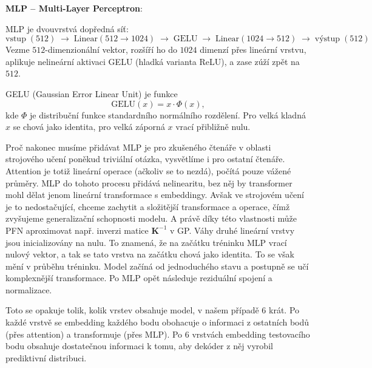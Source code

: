 \textbf{MLP – Multi-Layer Perceptron}:

MLP je dvouvrstvá dopředná síť:
$$\text{vstup}\;(512) \;\to\; \text{Linear}(512 \to 1024) \;\to\; \text{GELU} \;\to\; \text{Linear}(1024 \to 512) \;\to\; \text{výstup}\;(512)$$
Vezme $512$-dimenzionální vektor, rozšíří ho do $1024$ dimenzí přes lineární vrstvu, aplikuje nelineární aktivaci GELU (hladká varianta ReLU), a zase zúží zpět na $512$.

GELU (Gaussian Error Linear Unit) je funkce
$$\text{GELU}(x) = x \cdot \Phi(x),$$
kde $\Phi$ je distribuční funkce standardního normálního rozdělení.
Pro velká kladná $x$ se chová jako identita, pro velká záporná $x$ vrací přibližně nulu.

Proč nakonec musíme přidávat MLP je pro zkušeného čtenáře v oblasti strojového učení poněkud triviální otázka, vysvětlíme i pro ostatní čtenáře.
Attention je totiž lineární operace (ačkoliv se to nezdá), počítá pouze vážené průměry.
MLP do tohoto procesu přidává nelinearitu, bez něj by transformer mohl dělat jenom lineární transformace s embeddingy.
Avšak ve strojovém učení je to nedostačující, chceme zachytit a složitější transformace a operace, čímž zvyšujeme generalizační schopnosti modelu.
A právě díky této vlastnosti může PFN aproximovat např. inverzi matice $\mathbf{K}^{-1}$ v GP.
Váhy druhé lineární vrstvy jsou inicializovány na nulu.
To znamená, že na začátku tréninku MLP vrací nulový vektor, a tak se tato vrstva na začátku chová jako identita.
To se však mění v průběhu tréninku.
Model začíná od jednoduchého stavu a postupně se učí komplexnější transformace.
Po MLP opět následuje reziduální spojení a normalizace.
\par 

Toto se opakuje tolik, kolik vrstev obsahuje model, v našem případě $6$ krát.
Po každé vrstvě se embedding každého bodu obohacuje o informaci z ostatních bodů (přes attention) a transformuje (přes MLP). 
Po $6$ vrstvách embedding testovacího bodu obsahuje dostatečnou informaci k tomu, aby dekóder z něj vyrobil prediktivní distribuci.
\par   

